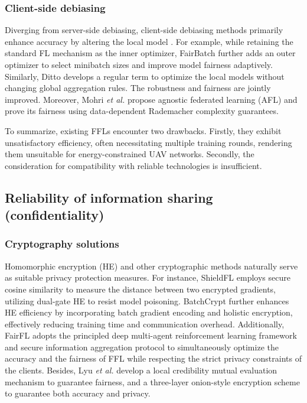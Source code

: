 \documentclass[lettersize,journal]{IEEEtran}
\begin{document}
\subsubsection{Client-side debiasing} %
Diverging from server-side debiasing, client-side debiasing methods primarily enhance accuracy by altering the local model \cite{tan2022towards}. 
For example, while retaining the standard FL mechanism as the inner optimizer, FairBatch \cite{roh2020fairbatch} further adds an outer optimizer to select minibatch sizes and improve model fairness adaptively. Similarly, Ditto \cite{li2021ditto} develops a regular term to optimize the local models without changing global aggregation rules. The robustness and fairness are jointly improved. 
Moreover, Mohri \textit{et al.} \cite{mohri2019agnostic} propose agnostic federated learning (AFL) and prove its fairness using data-dependent Rademacher complexity guarantees. 


To summarize, existing FFLs encounter two drawbacks. Firstly, they exhibit unsatisfactory efficiency, often necessitating multiple training rounds, rendering them unsuitable for energy-constrained UAV networks. Secondly, the consideration for compatibility with reliable technologies is insufficient.
\subsection{Reliability of information sharing (confidentiality)}%
\subsubsection{Cryptography solutions} 
Homomorphic encryption (HE) and other cryptographic methods naturally serve as suitable privacy protection measures. For instance, ShieldFL \cite{ma2022shieldfl} employs secure cosine similarity to measure the distance between two encrypted gradients, utilizing dual-gate HE to resist model poisoning. BatchCrypt \cite{zhang2020batchcrypt} further enhances HE efficiency by incorporating batch gradient encoding and holistic encryption, effectively reducing training time and communication overhead. Additionally, FairFL \cite{zhang2020fairfl} adopts the principled deep multi-agent reinforcement learning framework and secure information aggregation protocol to simultaneously optimize the accuracy and the fairness of FFL while respecting the strict privacy constraints of the clients. 
Besides, Lyu \textit{et al.} \cite{lyu2020towards} develop a local credibility mutual evaluation mechanism to guarantee fairness, and a three-layer onion-style encryption scheme to guarantee both accuracy and privacy. 
\end{document}

